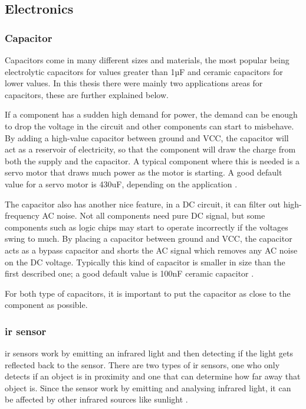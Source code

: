 \subsection{Electronics}
\subsubsection{Capacitor}
\label{sec:capacitor}
Capacitors come in many different sizes and materials, the most popular being electrolytic capacitors for values greater than 1µF and ceramic capacitors for lower values. In this thesis there were mainly two applications areas for capacitors, these are further explained below.

If a component has a sudden high demand for power, the demand can be enough to drop the voltage in the circuit and other components can start to misbehave. By adding a high-value capacitor between ground and VCC, the capacitor will act as a reservoir of electricity, so that the component will draw the charge from both the supply and the capacitor. A typical component where this is needed is a servo motor that draws much power as the motor is starting. A good default value for a servo motor is 430uF, depending on the application \cite{highcapacitor}.

The capacitor also has another nice feature, in a DC circuit, it can filter out high-frequency AC noise. Not all components need pure DC signal, but some components such as logic chips may start to operate incorrectly if the voltages swing to much. By placing a capacitor between ground and VCC, the capacitor acts as a bypass capacitor and shorts the AC signal which removes any AC noise on the DC voltage. Typically this kind of capacitor is smaller in size than the first described one; a good default value is 100nF ceramic capacitor \cite{lowcapacitor}.

For both type of capacitors, it is important to put the capacitor as close to the component as possible.

\subsubsection{\acrlong{ir} sensor}
\acrfull{ir} sensors work by emitting an infrared light and then detecting if the light gets reflected back to the sensor. There are two types of \acrshort{ir} sensors, one who only detects if an object is in proximity and one that can determine how far away that object is. Since the sensor work by emitting and analysing infrared light, it can be affected by other infrared sources like sunlight \cite{infrared}. 


